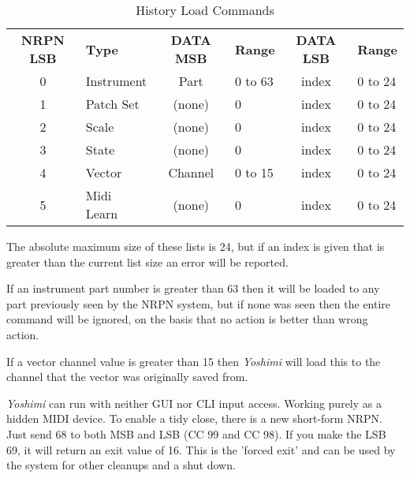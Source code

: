   \begin{table}[H]
      \centering
      \caption{History Load Commands}
      \label{table:history_load_commands}
      \begin{tabular}{c l c l c l}
\textbf{NRPN LSB} & \textbf{Type} & \textbf{DATA MSB} & \textbf{Range} & \textbf{DATA LSB}  & \textbf{Range}\\
        0 & Instrument & Part    & 0 to 63 & index   & 0 to 24 \\
        1 & Patch Set  & (none)  & 0       & index   & 0 to 24 \\
        2 & Scale      & (none)  & 0       & index   & 0 to 24 \\
        3 & State      & (none)  & 0       & index   & 0 to 24 \\
        4 & Vector     & Channel & 0 to 15 & index   & 0 to 24 \\
        5 & Midi Learn & (none)  & 0       & index   & 0 to 24 \\
      \end{tabular}
   \end{table}

   The absolute maximum size of these lists is 24, but if an index is given that
   is greater than the current list size an error will be reported.

   If an instrument part number is greater than 63 then it will be loaded to any
   part previously seen by the NRPN system, but if none was seen then the entire
   command will be ignored, on the basis that no action is better than wrong action.

   If a vector channel value is greater than 15 then \textsl{Yoshimi} will load this
   to the channel that the vector was originally saved from.


   \textsl{Yoshimi} can run with neither GUI nor CLI input access. Working purely as
   a hidden MIDI device. To enable a tidy close, there is a new short-form NRPN.
   Just send 68 to both MSB and LSB (CC 99 and CC 98). If you make the LSB 69, it
   will return an exit value of 16. This is the 'forced exit' and can be used by the
   system for other cleanups and a shut down.

